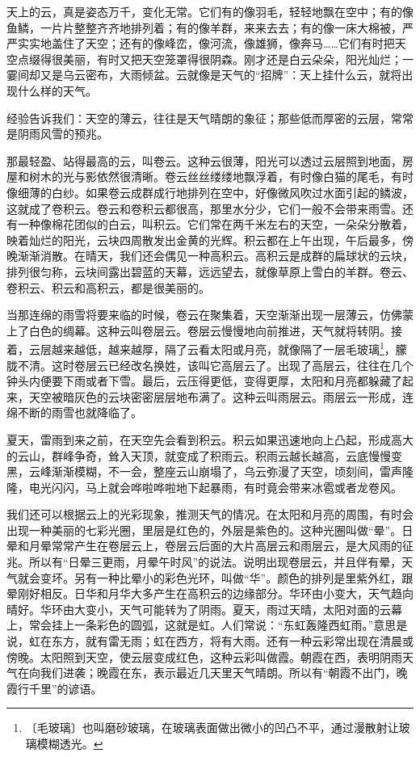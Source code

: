 \documentclass[12pt,UTF-8,openany]{ctexbook}
\begin{document}
\begin{normalsize}
    
    天上的云，真是姿态万千，变化无常。它们有的像羽毛，轻轻地飘在空中；有的像鱼鳞，一片片整整齐齐地排列着；有的像羊群，来来去去；有的像一床大棉被，严严实实地盖住了天空；还有的像峰峦，像河流，像雄狮，像奔马……它们有时把天空点缀得很美丽，有时又把天空笼罩得很阴森。刚才还是白云朵朵，阳光灿烂；一霎间却又是乌云密布，大雨倾盆。云就像是天气的“招牌”：天上挂什么云，就将出现什么样的天气。
    
    经验告诉我们：天空的薄云，往往是天气晴朗的象征；那些低而厚密的云层，常常是阴雨风雪的预兆。
    
    那最轻盈、站得最高的云，叫卷云。这种云很薄，阳光可以透过云层照到地面，房屋和树木的光与影依然很清晰。卷云丝丝缕缕地飘浮着，有时像白猫的尾毛，有时像细薄的白纱。如果卷云成群成行地排列在空中，好像微风吹过水面引起的鳞波，这就成了卷积云。卷云和卷积云都很高，那里水分少，它们一般不会带来雨雪。还有一种像棉花团似的白云，叫积云。它们常在两千米左右的天空，一朵朵分散着，映着灿烂的阳光，云块四周散发出金黄的光辉。积云都在上午出现，午后最多，傍晚渐渐消散。在晴天，我们还会偶见一种高积云。高积云是成群的扁球状的云块，排列很匀称，云块间露出碧蓝的天幕，远远望去，就像草原上雪白的羊群。卷云、卷积云、积云和高积云，都是很美丽的。
    
    当那连绵的雨雪将要来临的时候，卷云在聚集着，天空渐渐出现一层薄云，仿佛蒙上了白色的绸幕。这种云叫卷层云。卷层云慢慢地向前推进，天气就将转阴。接着，云层越来越低，越来越厚，隔了云看太阳或月亮，就像隔了一层毛玻璃\footnote{〔毛玻璃〕也叫磨砂玻璃，在玻璃表面做出微小的凹凸不平，通过漫散射让玻璃模糊透光。}，朦胧不清。这时卷层云已经改名换姓，该叫它高层云了。出现了高层云，往往在几个钟头内便要下雨或者下雪。最后，云压得更低，变得更厚，太阳和月亮都躲藏了起来，天空被暗灰色的云块密密层层地布满了。这种云叫雨层云。雨层云一形成，连绵不断的雨雪也就降临了。
    
    夏天，雷雨到来之前，在天空先会看到积云。积云如果迅速地向上凸起，形成高大的云山，群峰争奇，耸入天顶，就变成了积雨云。积雨云越长越高，云底慢慢变黑，云峰渐渐模糊，不一会，整座云山崩塌了，乌云弥漫了天空，顷刻间，雷声隆隆，电光闪闪，马上就会哗啦哗啦地下起暴雨，有时竟会带来冰雹或者龙卷风。
    
    我们还可以根据云上的光彩现象，推测天气的情况。在太阳和月亮的周围，有时会出现一种美丽的七彩光圈，里层是红色的，外层是紫色的。这种光圈叫做“晕”。日晕和月晕常常产生在卷层云上，卷层云后面的大片高层云和雨层云，是大风雨的征兆。所以有“日晕三更雨，月晕午时风”的说法。说明出现卷层云，并且伴有晕，天气就会变坏。另有一种比晕小的彩色光环，叫做“华”。颜色的排列是里紫外红，跟晕刚好相反。日华和月华大多产生在高积云的边缘部分。华环由小变大，天气趋向晴好。华环由大变小，天气可能转为了阴雨。夏天，雨过天晴，太阳对面的云幕上，常会挂上一条彩色的圆弧，这就是虹。人们常说：“东虹轰隆西虹雨。”意思是说，虹在东方，就有雷无雨；虹在西方，将有大雨。还有一种云彩常出现在清晨或傍晚。太阳照到天空，使云层变成红色，这种云彩叫做霞。朝霞在西，表明阴雨天气在向我们进袭；晚霞在东，表示最近几天里天气晴朗。所以有“朝霞不出门，晚霞行千里”的谚语。
    

\end{normalsize}
\end{document}
